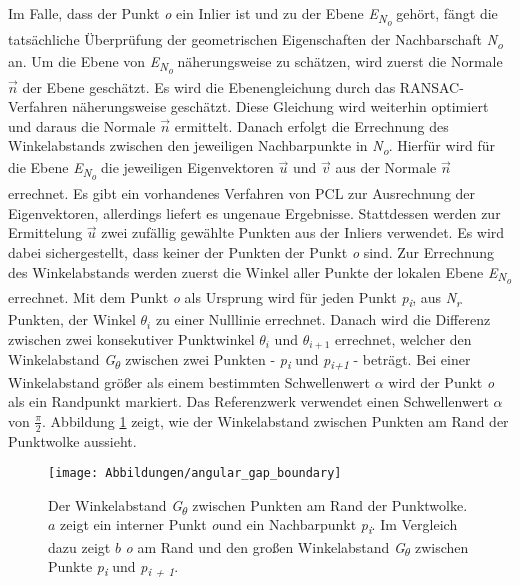 Im Falle, dass der Punkt \textit{o} ein Inlier ist und zu der Ebene \textit{E\textsubscript{N\textsubscript{o}}} gehört, fängt die tatsächliche Überprüfung der geometrischen Eigenschaften der Nachbarschaft \textit{N\textsubscript{o}} an. Um die Ebene von \textit{E\textsubscript{N\textsubscript{o}}} näherungsweise zu schätzen, wird zuerst die Normale \textit{$\vec{n}$} der Ebene geschätzt. Es wird die Ebenengleichung durch das RANSAC-Verfahren näherungsweise geschätzt. Diese Gleichung wird weiterhin optimiert und daraus die Normale \textit{$\vec{n}$} ermittelt. Danach erfolgt die Errechnung des Winkelabstands zwischen den jeweiligen Nachbarpunkte in \textit{N\textsubscript{o}}. Hierfür wird für die Ebene \textit{E\textsubscript{N\textsubscript{o}}} die jeweiligen Eigenvektoren $\vec{u}$ und $\vec{v}$ aus der Normale $\vec{n}$ errechnet. Es gibt ein vorhandenes Verfahren von PCL zur Ausrechnung der Eigenvektoren, allerdings liefert es ungenaue Ergebnisse. Stattdessen werden zur Ermittelung \textit{$\vec{u}$} zwei zufällig gewählte Punkten aus der Inliers verwendet. Es wird dabei sichergestellt, dass keiner der Punkten der Punkt \textit{o} sind. Zur Errechnung des Winkelabstands werden zuerst die Winkel aller Punkte der lokalen Ebene \textit{E\textsubscript{N\textsubscript{o}}} errechnet. Mit dem Punkt \textit{o} als Ursprung wird für jeden Punkt \textit{p\textsubscript{i}}, aus \textit{N\textsubscript{r}} Punkten, der Winkel \textit{$\theta_i$} zu einer Nulllinie errechnet. Danach wird die Differenz zwischen zwei konsekutiver Punktwinkel $\theta_i$ und $\theta_{i+1}$ errechnet, welcher den Winkelabstand \textit{G\textsubscript{$\theta$}} zwischen zwei Punkten - \textit{p\textsubscript{i}} und \textit{p\textsubscript{i+1}} - beträgt. Bei einer Winkelabstand größer als einem bestimmten Schwellenwert $\alpha$ wird der Punkt \textit{o} als ein Randpunkt markiert. Das Referenzwerk verwendet einen Schwellenwert $\alpha$ von $\frac{\pi}{2}$. Abbildung \ref{edge_boundary} zeigt, wie der Winkelabstand zwischen Punkten am Rand der Punktwolke aussieht.

\begin{figure}[h]
	\texttt{[image: Abbildungen/angular\_gap\_boundary]}
	\centering
	\caption{Der Winkelabstand \textit{G\textsubscript{$\theta$}} zwischen Punkten am Rand der Punktwolke. \textbf{\(a\)} zeigt ein interner Punkt \textit{o}und ein Nachbarpunkt \textit{p\textsubscript{i}}. Im Vergleich dazu zeigt \textbf{\(b\)} \textit{o} am Rand und den großen Winkelabstand \textit{G\textsubscript{$\theta$}} zwischen Punkte \textit{p\textsubscript{i}} und \textit{p\textsubscript{i + 1}}. \autocite{ni_edge_2016}}
	\label{edge_boundary}
\end{figure}

